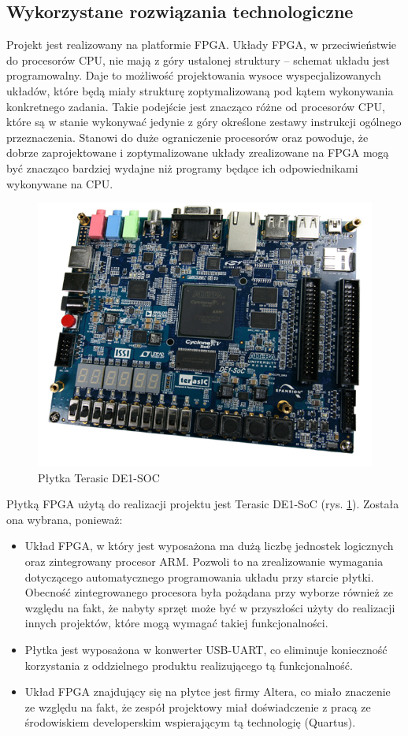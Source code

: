 \subsection{Wykorzystane rozwiązania technologiczne}
Projekt jest realizowany na platformie FPGA. Układy FPGA, w przeciwieństwie do procesorów CPU, nie mają z góry ustalonej struktury -- schemat układu jest programowalny. Daje to możliwość projektowania wysoce wyspecjalizowanych układów, które będą miały strukturę zoptymalizowaną pod kątem wykonywania konkretnego zadania. Takie podejście jest znacząco różne od procesorów CPU, które są w stanie wykonywać jedynie z góry określone zestawy instrukcji ogólnego przeznaczenia. Stanowi do duże ograniczenie procesorów oraz powoduje, że dobrze zaprojektowane i zoptymalizowane układy zrealizowane na FPGA mogą być znacząco bardziej wydajne niż programy będące ich odpowiednikami wykonywane na CPU.

\begin{figure}[!h]
\centering
\includegraphics[width=\textwidth]{pictures/fpga-board.jpg}
\caption{Płytka Terasic DE1-SOC}
\label{fig:fpga-board}
\end{figure}

Płytką FPGA użytą do realizacji projektu jest Terasic DE1-SoC (rys. \ref{fig:fpga-board}). Została ona wybrana, ponieważ:
\begin{itemize}
\item Układ FPGA, w który jest wyposażona ma dużą liczbę jednostek logicznych oraz zintegrowany procesor ARM. Pozwoli to na zrealizowanie wymagania dotyczącego automatycznego programowania układu przy starcie płytki. Obecność zintegrowanego procesora była pożądana przy wyborze również ze względu na fakt, że nabyty sprzęt może być w przyszłości użyty do realizacji innych projektów, które mogą wymagać takiej funkcjonalności.
\item Płytka jest wyposażona w konwerter USB-UART, co eliminuje konieczność korzystania z oddzielnego produktu realizującego tą funkcjonalność.
\item Układ FPGA znajdujący się na płytce jest firmy Altera, co miało znaczenie ze względu na fakt, że zespół projektowy miał doświadczenie z pracą ze środowiskiem developerskim wspierającym tą technologię (Quartus).
\end{itemize}


